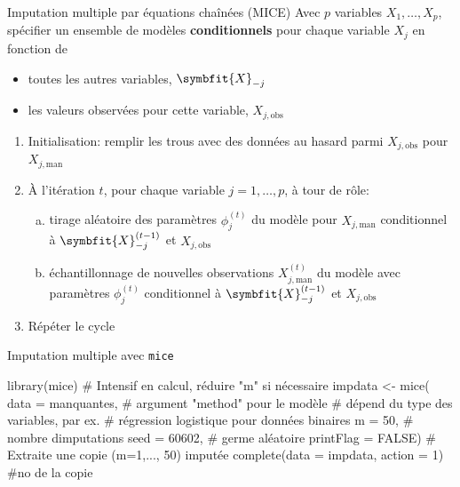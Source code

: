 \documentclass[
  ignorenonframetext,
]{beamer}
\newenvironment{Shaded}{\begin{snugshade}}{\end{snugshade}}
\newcommand{\AttributeTok}[1]{\textcolor[rgb]{0.40,0.45,0.13}{#1}}
\newcommand{\CommentTok}[1]{\textcolor[rgb]{0.37,0.37,0.37}{#1}}
\newcommand{\ConstantTok}[1]{\textcolor[rgb]{0.56,0.35,0.01}{#1}}
\newcommand{\DecValTok}[1]{\textcolor[rgb]{0.68,0.00,0.00}{#1}}
\newcommand{\FunctionTok}[1]{\textcolor[rgb]{0.28,0.35,0.67}{#1}}
\newcommand{\NormalTok}[1]{\textcolor[rgb]{0.00,0.23,0.31}{#1}}
\newcommand{\OtherTok}[1]{\textcolor[rgb]{0.00,0.23,0.31}{#1}}
\providecommand{\tightlist}{%
  \setlength{\itemsep}{0pt}\setlength{\parskip}{0pt}}\usepackage{longtable,booktabs,array}
\renewcommand{\boldsymbol}[1]{\symbfit{#1}}
\begin{document}
\begin{frame}{Imputation multiple par équations chaînées (MICE)}
\label{imputation-multiple-par-uxe9quations-chauxeenuxe9es-mice}
Avec \(p\) variables \(X_1, \ldots, X_p\), spécifier un ensemble de
modèles \textbf{conditionnels} pour chaque variable \(X_j\) en fonction
de

\begin{itemize}
\tightlist
\item
  toutes les autres variables, \(\boldsymbol{X}_{-j}\)
\item
  les valeurs observées pour cette variable, \(X_{j, \text{obs}}\)
\end{itemize}

\begin{enumerate}
\tightlist
\item
  Initialisation: remplir les trous avec des données au hasard parmi
  \(X_{j, \text{obs}}\) pour \(X_{j, \text{man}}\)
\item
  À l'itération \(t\), pour chaque variable \(j=1, \ldots, p\), à tour
  de rôle:

  \begin{enumerate}
  [a)]
  \tightlist
  \item
    tirage aléatoire des paramètres \(\phi_j^{(t)}\) du modèle pour
    \(X_{j,\text{man}}\) conditionnel à \(\boldsymbol{X}_{-j}^{(t-1)}\)
    et \(X_{j, \text{obs}}\)
  \item
    échantillonnage de nouvelles observations \(X^{(t)}_{j,\text{man}}\)
    du modèle avec paramètres \(\phi_j^{(t)}\) conditionnel à
    \(\boldsymbol{X}_{-j}^{(t-1)}\) et \(X_{j, \text{obs}}\)
  \end{enumerate}
\item
  Répéter le cycle
\end{enumerate}
\end{frame}

\begin{frame}[fragile]{Imputation multiple avec \texttt{mice}}
\label{imputation-multiple-avec-mice}
\begin{Shaded}
\begin{Highlighting}[numbers=left,,]
\FunctionTok{library}\NormalTok{(mice)}
\CommentTok{\# Intensif en calcul, réduire "m" si nécessaire}
\NormalTok{impdata }\OtherTok{\textless{}{-}} \FunctionTok{mice}\NormalTok{(}
   \AttributeTok{data =}\NormalTok{ manquantes,}
   \CommentTok{\# argument "method" pour le modèle}
   \CommentTok{\# dépend du type des variables, par ex.}
   \CommentTok{\# régression logistique pour données binaires}
   \AttributeTok{m =} \DecValTok{50}\NormalTok{, }\CommentTok{\# nombre d\textquotesingle{}imputations}
   \AttributeTok{seed =} \DecValTok{60602}\NormalTok{, }\CommentTok{\# germe aléatoire}
   \AttributeTok{printFlag =} \ConstantTok{FALSE}\NormalTok{)}
\CommentTok{\# Extraite une copie (m=1,..., 50) imputée }
\FunctionTok{complete}\NormalTok{(}\AttributeTok{data =}\NormalTok{ impdata, }
         \AttributeTok{action =} \DecValTok{1}\NormalTok{) }\CommentTok{\#no de la copie}
\end{Highlighting}
\end{Shaded}
\end{frame}
\end{document}
